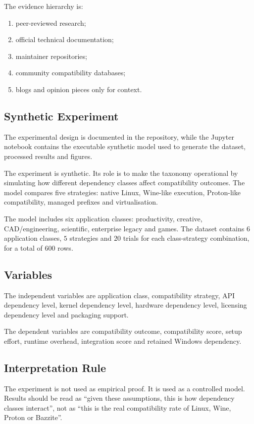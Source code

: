 \documentclass[conference]{IEEEtran}
\begin{document}
The evidence hierarchy is:
\begin{enumerate}
    \item peer-reviewed research;
    \item official technical documentation;
    \item maintainer repositories;
    \item community compatibility databases;
    \item blogs and opinion pieces only for context.
\end{enumerate}

\subsection{Synthetic Experiment}

The experimental design is documented in the repository, while the Jupyter notebook contains the executable synthetic model used to generate the dataset, processed results and figures.

The experiment is synthetic. Its role is to make the taxonomy operational by simulating how different dependency classes affect compatibility outcomes. The model compares five strategies: native Linux, Wine-like execution, Proton-like compatibility, managed prefixes and virtualisation.

The model includes six application classes: productivity, creative, CAD/engineering, scientific, enterprise legacy and games. The dataset contains $6$ application classes, $5$ strategies and $20$ trials for each class-strategy combination, for a total of $600$ rows.

\subsection{Variables}

The independent variables are application class, compatibility strategy, API dependency level, kernel dependency level, hardware dependency level, licensing dependency level and packaging support.

The dependent variables are compatibility outcome, compatibility score, setup effort, runtime overhead, integration score and retained Windows dependency.

\subsection{Interpretation Rule}

The experiment is not used as empirical proof. It is used as a controlled model. Results should be read as ``given these assumptions, this is how dependency classes interact'', not as ``this is the real compatibility rate of Linux, Wine, Proton or Bazzite''.
\end{document}
